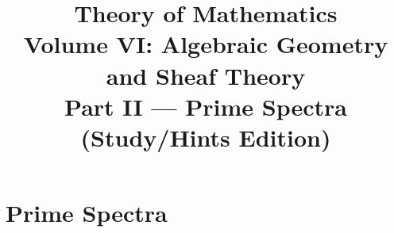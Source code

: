 \documentclass[11pt,a4paper,oneside,openany]{book}
\title{Theory of Mathematics\\[0.5em]\Large Volume VI: Algebraic Geometry and Sheaf Theory\\[0.4em]\normalsize Part II --- Prime Spectra (Study/Hints Edition)}
\author{}\date{}
\begin{document}
\maketitle\clearpage
\frontmatter\tableofcontents
\mainmatter
\part{Prime Spectra}






\end{document}
